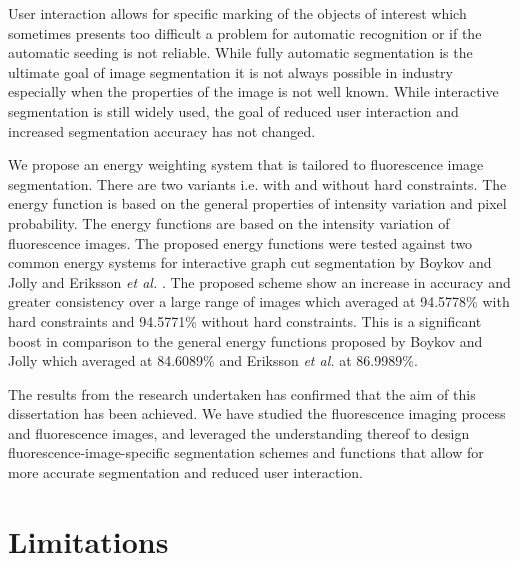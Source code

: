 \begin{definition}
	User interaction allows for specific marking of the objects of interest which sometimes presents too difficult a problem for automatic recognition or if the automatic seeding is not reliable. While fully automatic segmentation is the ultimate goal of image segmentation it is not always possible in industry especially when the properties of the image is not well known. While interactive segmentation is still widely used, the goal of reduced user interaction and increased segmentation accuracy has not changed.
	
	We propose an energy weighting system that is tailored to fluorescence image segmentation. There are two variants i.e. with and without hard constraints. The energy function is based on the general properties of intensity variation and pixel probability. The energy functions are based on the intensity variation of fluorescence images.
	The proposed energy functions were tested against two common energy systems for interactive graph cut segmentation by Boykov and Jolly \citep{Boykov2001_2} and Eriksson \textit{et al.} \citep{Eriksson2006}.
	The proposed scheme show an increase in accuracy and greater consistency over a large range of images which averaged at 94.5778\% with hard constraints and 94.5771\% without hard constraints. This is a significant boost in comparison to the general energy functions proposed by Boykov and Jolly \citep{Boykov2001_2} which averaged at 84.6089\% and Eriksson \textit{et al.} \citep{Eriksson2006} at 86.9989\%.
\end{definition}

The results from the research undertaken has confirmed that the aim of this dissertation has been achieved. We have studied the fluorescence imaging process and fluorescence images, and leveraged the understanding thereof to design fluorescence-image-specific segmentation schemes and functions that allow for more accurate segmentation and reduced user interaction.

\section{Limitations}

